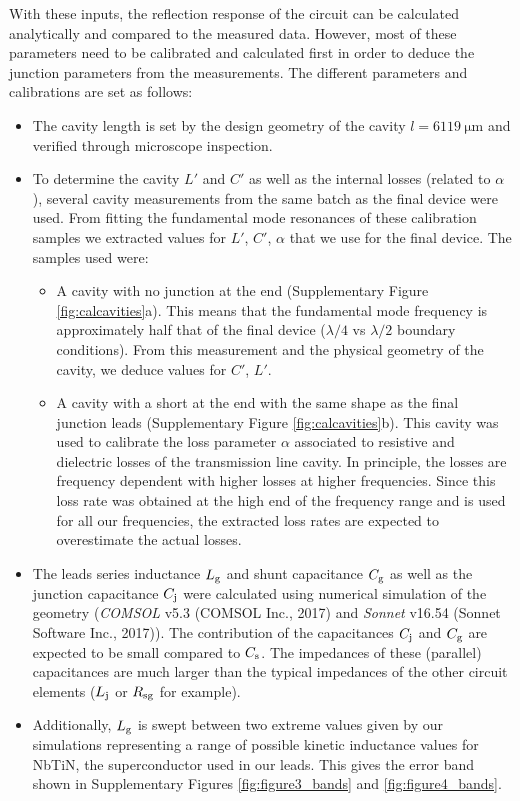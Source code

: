 \documentclass[preprint,
  onecolumn,
  notitlepage,
  amsmath,amssymb,
  aip,
  apl,
]{revtex4-1}
\begin{document}
With these inputs, the reflection response of the circuit can be calculated analytically and compared to the measured data.
However, most of these parameters need to be calibrated and calculated first in order to deduce the junction parameters from the measurements.
The different parameters and calibrations are set as follows:
\begin{itemize}
    \item The cavity length is set by the design geometry of the cavity $l=\SI{6119}{\micro\meter}$ and verified through microscope inspection.
    \item To determine the cavity $L'$ and $C'$ as well as the internal losses (related to $\alpha$), several cavity measurements from the same batch as the final device were used.
    From fitting the fundamental mode resonances of these calibration samples we extracted values for $L'$, $C'$, $\alpha$ that we use for the final device.
    The samples used were:
    \begin{itemize}
        \item A cavity with no junction at the end (Supplementary Figure \ref{fig:calcavities}a).
        This means that the fundamental mode frequency is approximately half that of the final device ($\lambda/4$ vs $\lambda/2$ boundary conditions).
        From this measurement and the physical geometry of the cavity, we deduce values for $C'$, $L'$.
        \item A cavity with a short at the end with the same shape as the final junction leads (Supplementary Figure \ref{fig:calcavities}b).
        This cavity was used to calibrate the loss parameter $\alpha$ associated to resistive and dielectric losses of the transmission line cavity.
        In principle, the losses are frequency dependent with higher losses at higher frequencies.
        Since this loss rate was obtained at the high end of the frequency range and is used for all our frequencies, the extracted loss rates are expected to overestimate the actual losses.
    \end{itemize}
    \item The leads series inductance $L_{\rm g}$ and shunt capacitance $C_{\rm g}$ as well as the junction capacitance $C_{\rm j}$ were calculated using numerical simulation of the geometry (\textit{COMSOL} v5.3 (COMSOL Inc., 2017) and \textit{Sonnet} v16.54 (Sonnet Software Inc., 2017)).
    The contribution of the capacitances $C_{\rm j}$ and $C_{\rm g}$ are expected to be small compared to $C_{\rm s}$.
    The impedances of these (parallel) capacitances are much larger than the typical impedances of the other circuit elements ($L_{\rm j}$ or $R_{\rm sg}$ for example).
    \item Additionally, $L_{\rm g}$ is swept between two extreme values given by our simulations representing a range of possible kinetic inductance values for NbTiN, the superconductor used in our leads.
    This gives the error band shown in Supplementary Figures \ref{fig:figure3_bands} and \ref{fig:figure4_bands}.
\end{itemize}
\end{document}
